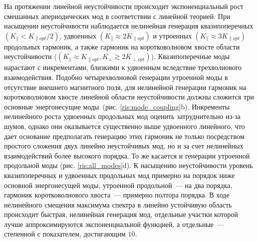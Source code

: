 На протяжении линейной неустойчивости происходит экспоненциальный рост смешанных апериодических мод в соответствии с линейной теорией. При насыщении неустойчивости наблюдается нелинейная генерация квазипоперечных $\left(K_\|<K_{\|opt}/2\right)$, удвоенных $\left(K_\|\approx2K_{\|opt}\right)$ и утроенных $\left(K_\|\approx3K_{\|opt}\right)$ продольных гармоник, а также гармоник на коротковолновом хвосте области неустойчивости ($\left(K_\|\approx K_{\|opt},K_\perp\gtrsim2K_{\perp opt}\right)$). Квазипоперечные моды нарастают с инкрементами, близкими к удвоенным вследствие трехволнового взаимодействия. Подобно четырехволновой генерации утроенной моды в отсутствие внешнего магнитного поля, для нелинейной генерации гармоник на коротковолновом хвосте линейной области неустойчивости должны сложится три основные энергонесущие моды~(рис. \ref{ris:mode_coupling}b). Инкременты нелинейного роста удвоенных продольных мод оценить затруднительно из-за шумов, однако они оказывается существенно выше удвоенного линейного, что дает основание предполагать генерацию этих гармоник не только посредством простого сложения двух линейно неустойчивых мод, но и за счет нелинейных взаимодействий более высокого порядка. То же касается и генерации утроенной продольной моды (рис. \ref{ris:all_modes}d). К насыщению неустойчивости уровень квазипоперечных и удвоенных продольных мод примерно на порядок ниже основной энергонесущей моды, утроенной продольной~--- на два порядка, гармоник коротковолнового хвоста~--- примерно полтора порядка. В ходе нелинейного смещения максимума спектра в линейно устойчивую область происходит быстрая, нелинейная генерация мод, отдельные участки которой лучше аппроксимируются экспоненциальной функцией, а отдельные~--- степенной с показателем, достигающим $10$. 
  